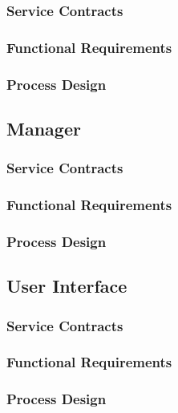 \documentclass[11pt]{article}
\begin{document}
\subsubsection{Service Contracts}
\subsubsection{Functional Requirements}
\subsubsection{Process Design}

\subsection{Manager}
\subsubsection{Service Contracts}
\subsubsection{Functional Requirements}
\subsubsection{Process Design}

\subsection{User Interface}
\subsubsection{Service Contracts}
\subsubsection{Functional Requirements}
\subsubsection{Process Design}
\end{document}
